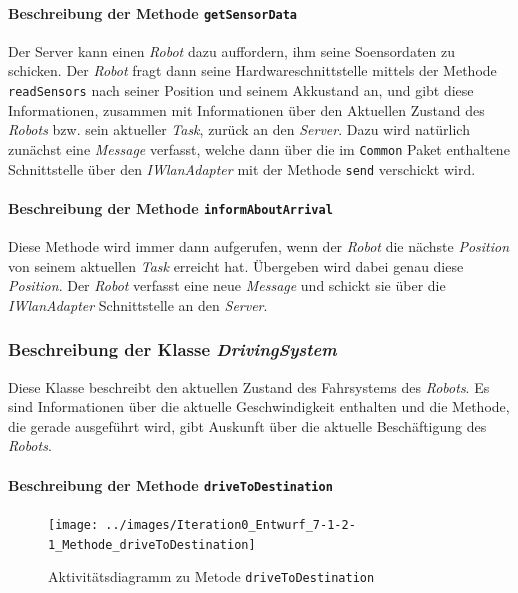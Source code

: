 			\paragraph{Beschreibung der Methode \texttt{getSensorData}}
			Der Server kann einen \textit{Robot} dazu auffordern, ihm seine Soensordaten zu schicken. Der \textit{Robot} fragt dann seine Hardwareschnittstelle mittels der Methode \texttt{readSensors} 
			nach seiner Position und seinem Akkustand an, und gibt diese Informationen, zusammen mit Informationen über den Aktuellen Zustand des \textit{Robots} bzw. sein aktueller \textit{Task}, zurück an den \textit{Server}. Dazu wird natürlich zunächst eine \textit{Message} verfasst, welche dann über die im \texttt{Common} Paket enthaltene Schnittstelle über den \textit{IWlanAdapter} mit der Methode \texttt{send} verschickt wird.
			
			\paragraph{Beschreibung der Methode \texttt{informAboutArrival}}
			Diese Methode wird immer dann aufgerufen, wenn der \textit{Robot} die nächste \textit{Position} von seinem aktuellen \textit{Task} erreicht hat. Übergeben wird dabei genau diese \textit{Position}. Der \textit{Robot} verfasst eine neue \textit{Message} und schickt sie über die \textit{IWlanAdapter} Schnittstelle an den \textit{Server}. 
			
	\subsubsection{Beschreibung der Klasse \textit{DrivingSystem}}
		
		Diese Klasse beschreibt den aktuellen Zustand des Fahrsystems des \textit{Robots}. 
		Es sind Informationen über die aktuelle Geschwindigkeit enthalten und die Methode, 
		die gerade ausgeführt wird, gibt Auskunft über die aktuelle Beschäftigung des \textit{Robots}.

			\paragraph{Beschreibung der Methode \texttt{driveToDestination}}
			\begin{figure}[H]
			\centering
			\texttt{[image: ../images/Iteration0\_Entwurf\_7-1-2-1\_Methode\_driveToDestination]}
			\caption{Aktivitätsdiagramm zu Metode \texttt{driveToDestination}}
			\label{AktivitaetDriveToDestination}
			\end{figure}


